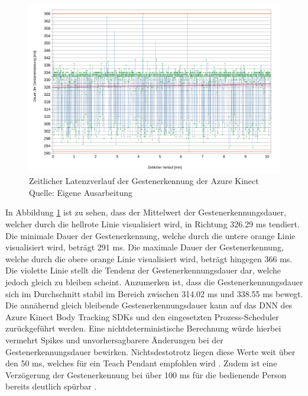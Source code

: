 \begin{figure}[htb]
	\centering
	\includegraphics[width=1.04\textwidth]{images/ergebnisse/dauer_der_gestenerkennung_verlauf}
	\caption[Zeitlicher Latenzverlauf der Gestenerkennung der Azure Kinect]{Zeitlicher Latenzverlauf der Gestenerkennung der Azure Kinect\\Quelle: Eigene Ausarbeitung}
	\label{fig:measurement_gesture_recognition_azure_kinect}
\end{figure}
\FloatBarrier

In Abbildung \ref{fig:measurement_gesture_recognition_azure_kinect} ist zu sehen, dass der Mittelwert der Gestenerkennungsdauer, welcher durch die hellrote Linie visualisiert wird, in Richtung \num{326,29} ms tendiert. Die minimale Dauer der Gestenerkennung, welche durch die untere orange Linie visualisiert wird, beträgt \num{291} ms. Die maximale Dauer der Gestenerkennung, welche durch die obere orange Linie visualisiert wird, beträgt hingegen \num{366} ms. Die violette Linie stellt die Tendenz der Gestenerkennungsdauer dar, welche jedoch gleich zu bleiben scheint. Anzumerken ist, dass die Gestenerkennungsdauer sich im Durchschnitt stabil im Bereich zwischen \num{314,02} ms und \num{338,55} ms bewegt. Die annähernd gleich bleibende Gestenerkennungsdauer kann auf das DNN des Azure Kinect Body Tracking SDKs und den eingesetzten Prozess-Scheduler zurückgeführt werden. Eine nichtdeterministische Berechnung würde hierbei vermehrt Spikes und unvorhersagbarere Änderungen bei der Gestenerkennungsdauer bewirken. Nichtsdestotrotz liegen diese Werte weit über den 50 ms, welches für ein Teach Pendant empfohlen wird \cite[55]{prassler_advances_2004}. Zudem ist eine Verzögerung der Gestenerkennung bei über 100 ms für die bedienende Person bereits deutlich spürbar \cite{miller_response_1968}.

